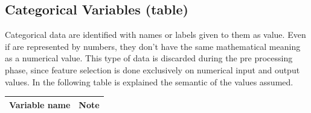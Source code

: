 \subsection{Categorical Variables (table)}
Categorical data are identified with names or labels given to them as value. Even if are represented by numbers, they don't have the same mathematical meaning as a numerical value. This type of data is discarded during the pre processing phase, since feature selection is done exclusively on numerical input and output values. 
In the following table is explained the semantic of the values assumed.
\bigbreak
\begin{center} 
\setlength{\arrayrulewidth}{1.5pt}
\begin{longtable}{ |p{2.5cm}|p{10cm}| } 
\hline
\textbf{Variable name} & \textbf{Note}\\ 
\hline


\end{longtable}
\end{center}
